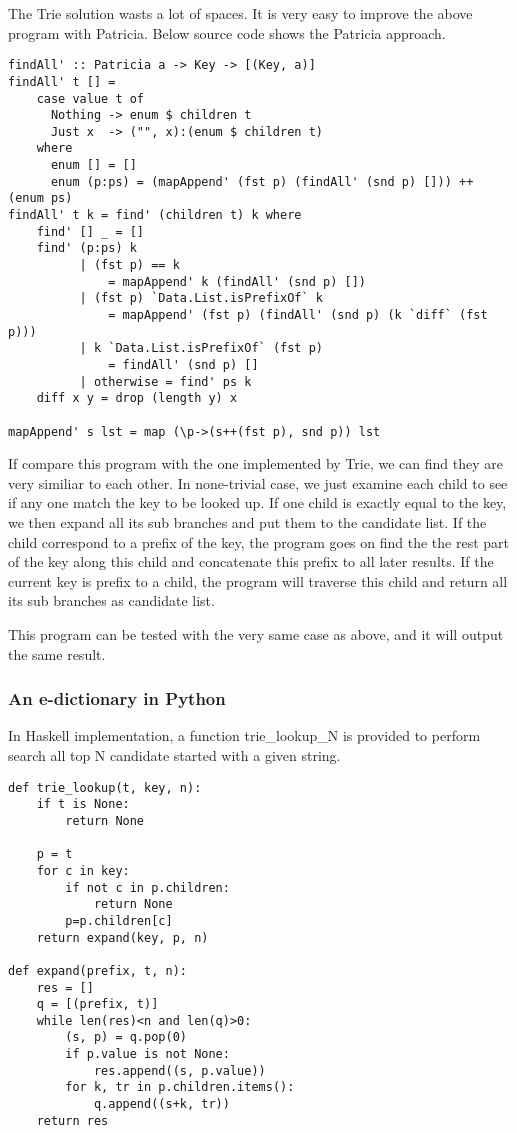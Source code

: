 \documentclass{article}
\begin{document}
The Trie solution wasts a lot of spaces. It is very easy to improve the above
program with Patricia. Below source code shows the Patricia approach.

\begin{lstlisting}
findAll' :: Patricia a -> Key -> [(Key, a)]
findAll' t [] =
    case value t of
      Nothing -> enum $ children t
      Just x  -> ("", x):(enum $ children t)
    where
      enum [] = []
      enum (p:ps) = (mapAppend' (fst p) (findAll' (snd p) [])) ++ (enum ps)
findAll' t k = find' (children t) k where
    find' [] _ = []
    find' (p:ps) k
          | (fst p) == k 
              = mapAppend' k (findAll' (snd p) [])
          | (fst p) `Data.List.isPrefixOf` k 
              = mapAppend' (fst p) (findAll' (snd p) (k `diff` (fst p)))
          | k `Data.List.isPrefixOf` (fst p) 
              = findAll' (snd p) []
          | otherwise = find' ps k
    diff x y = drop (length y) x

mapAppend' s lst = map (\p->(s++(fst p), snd p)) lst
\end{lstlisting}

If compare this program with the one implemented by Trie, we can find they are
very similiar to each other. In none-trivial case, we just examine each child
to see if any one match the key to be looked up. If one child is exactly equal
to the key, we then expand all its sub branches and put them to the candidate list.
If the child correspond to a prefix of the key, the program goes on find the 
the rest part of the key along this child and concatenate this prefix to all 
later results. If the current key is prefix to a child, the program will traverse
this child and return all its sub branches as candidate list.

This program can be tested with the very same case as above, and it will output
the same result.

\subsubsection*{An e-dictionary in Python}
In Haskell implementation, a function trie\_lookup\_N is provided to perform
search all top N candidate started with a given string.

\lstset{language=Python}
\begin{lstlisting}
def trie_lookup(t, key, n):
    if t is None:
        return None

    p = t
    for c in key:
        if not c in p.children:
            return None
        p=p.children[c]
    return expand(key, p, n)

def expand(prefix, t, n):
    res = []
    q = [(prefix, t)]
    while len(res)<n and len(q)>0:
        (s, p) = q.pop(0)
        if p.value is not None:
            res.append((s, p.value))
        for k, tr in p.children.items():
            q.append((s+k, tr))
    return res
\end{lstlisting}
\end{document}
